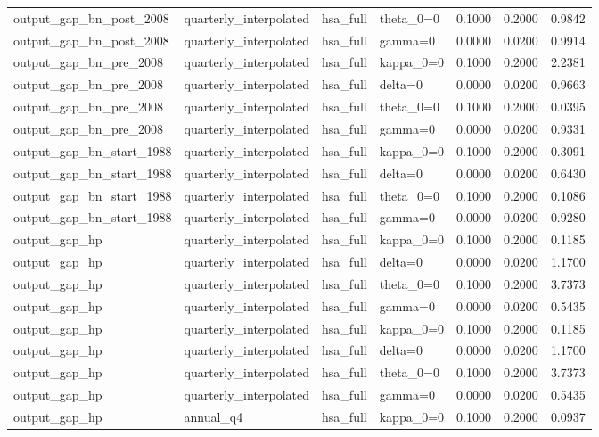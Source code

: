 \begin{tabular}{llllrrr}
output\_gap\_bn\_post\_2008 & quarterly\_interpolated & hsa\_full & theta\_0=0 & 0.1000 & 0.2000 & 0.9842 \\
output\_gap\_bn\_post\_2008 & quarterly\_interpolated & hsa\_full & gamma=0 & 0.0000 & 0.0200 & 0.9914 \\
output\_gap\_bn\_pre\_2008 & quarterly\_interpolated & hsa\_full & kappa\_0=0 & 0.1000 & 0.2000 & 2.2381 \\
output\_gap\_bn\_pre\_2008 & quarterly\_interpolated & hsa\_full & delta=0 & 0.0000 & 0.0200 & 0.9663 \\
output\_gap\_bn\_pre\_2008 & quarterly\_interpolated & hsa\_full & theta\_0=0 & 0.1000 & 0.2000 & 0.0395 \\
output\_gap\_bn\_pre\_2008 & quarterly\_interpolated & hsa\_full & gamma=0 & 0.0000 & 0.0200 & 0.9331 \\
output\_gap\_bn\_start\_1988 & quarterly\_interpolated & hsa\_full & kappa\_0=0 & 0.1000 & 0.2000 & 0.3091 \\
output\_gap\_bn\_start\_1988 & quarterly\_interpolated & hsa\_full & delta=0 & 0.0000 & 0.0200 & 0.6430 \\
output\_gap\_bn\_start\_1988 & quarterly\_interpolated & hsa\_full & theta\_0=0 & 0.1000 & 0.2000 & 0.1086 \\
output\_gap\_bn\_start\_1988 & quarterly\_interpolated & hsa\_full & gamma=0 & 0.0000 & 0.0200 & 0.9280 \\
output\_gap\_hp & quarterly\_interpolated & hsa\_full & kappa\_0=0 & 0.1000 & 0.2000 & 0.1185 \\
output\_gap\_hp & quarterly\_interpolated & hsa\_full & delta=0 & 0.0000 & 0.0200 & 1.1700 \\
output\_gap\_hp & quarterly\_interpolated & hsa\_full & theta\_0=0 & 0.1000 & 0.2000 & 3.7373 \\
output\_gap\_hp & quarterly\_interpolated & hsa\_full & gamma=0 & 0.0000 & 0.0200 & 0.5435 \\
output\_gap\_hp & quarterly\_interpolated & hsa\_full & kappa\_0=0 & 0.1000 & 0.2000 & 0.1185 \\
output\_gap\_hp & quarterly\_interpolated & hsa\_full & delta=0 & 0.0000 & 0.0200 & 1.1700 \\
output\_gap\_hp & quarterly\_interpolated & hsa\_full & theta\_0=0 & 0.1000 & 0.2000 & 3.7373 \\
output\_gap\_hp & quarterly\_interpolated & hsa\_full & gamma=0 & 0.0000 & 0.0200 & 0.5435 \\
output\_gap\_hp & annual\_q4 & hsa\_full & kappa\_0=0 & 0.1000 & 0.2000 & 0.0937 \\

\end{tabular}
